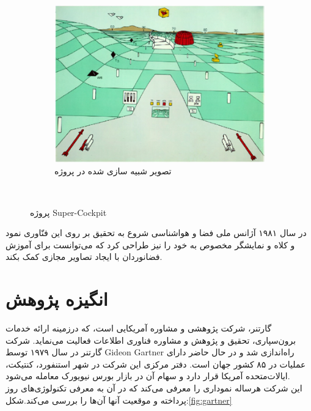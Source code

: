 \begin{figure}
\begin{subfigure}[b]{0.5\textwidth}
		\includegraphics[width=\textwidth]{image/airforce2}
		\caption{تصویر شبیه سازی شده در پروژه}
		\label{fig:tiger}
	\end{subfigure}
	~ %
	
	\caption{پروژه Super-Cockpit \cite{Furness2}}\label{fig:Super-Cockpit}
\end{figure}


در سال ۱۹۸۱ آژانس ملی فضا و هواشناسی  شروع به تحقیق بر روی این فنّاوری نمود و کلاه و نمایشگر مخصوص به خود را نیز طراحی کرد که می‌توانست برای آموزش فضانوردان با ایجاد تصاویر مجازی کمک بکند\cite{Furness2}.
\\
\section{انگیزه پژوهش}
\noindent
گارتنر، شرکت پژوهشی و مشاوره آمریکایی است، که درزمینه ارائه خدمات برون‌سپاری، تحقیق و پژوهش و مشاوره فناوری اطلاعات فعالیت می‌نماید. شرکت گارتنر در سال ۱۹۷۹ توسط Gideon Gartner راه‌اندازی شد و در حال حاضر دارای عملیات در ۸۵ کشور جهان است. دفتر مرکزی این شرکت در شهر استنفورد، کنتیکت، ایالات‌متحده آمریکا قرار دارد و سهام آن در بازار بورس نیویورک معامله می‌شود.
\\
این شرکت هرساله نموداری را معرفی می‌کند که در آن به معرفی تکنولوژی‌های روز پرداخته و موقعیت آنها آن‌ها را بررسی می‌کند.شکل:\ref{fig:gartner}
\\

